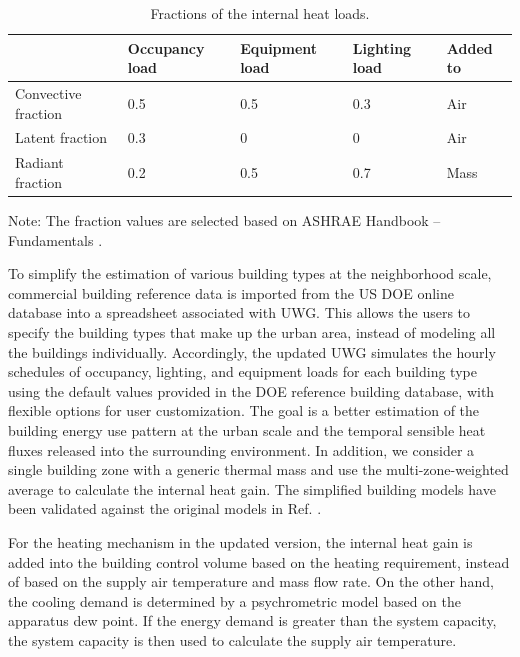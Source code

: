 \begin{table}[]
\centering
\footnotesize
\caption{Fractions of the internal heat loads.}
\label{my-label}
\begin{tabular}{lllll}
\toprule
                    & Occupancy load & Equipment load & Lighting load & Added to \\ \hline
Convective fraction & 0.5            & 0.5            & 0.3           & Air      \\
Latent fraction     & 0.3            & 0              & 0             & Air      \\
Radiant fraction    & 0.2            & 0.5            & 0.7           & Mass     \\
\bottomrule
\end{tabular}
\vspace{2.5ex}

\raggedright Note: The fraction values are selected based on ASHRAE Handbook -- Fundamentals \cite{handbook2009american}.
\end{table}

To simplify the estimation of various building types at the neighborhood scale, commercial building reference data is imported from the US DOE online database \cite{deru2011us} into a spreadsheet associated with UWG. This allows the users to specify the building types that make up the urban area, instead of modeling all the buildings individually. Accordingly, the updated UWG simulates the hourly schedules of occupancy, lighting, and equipment loads for each building type using the default values provided in the DOE reference building database, with flexible options for user customization. The goal is a better estimation of the building energy use pattern at the urban scale and the temporal sensible heat fluxes released into the surrounding environment. In addition, we consider a single building zone with a generic thermal mass and use the multi-zone-weighted average to calculate the internal heat gain. The simplified building models have been validated against the original models in Ref. \cite{yang2016curious}.

For the heating mechanism in the updated version, the internal heat gain is added into the building control volume based on the heating requirement, instead of based on the supply air temperature and mass flow rate. On the other hand, the cooling demand is determined by a psychrometric model based on the apparatus dew point. If the energy demand is greater than the system capacity, the system capacity is then used to calculate the supply air temperature.

